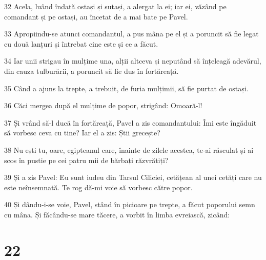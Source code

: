 \par 32 Acela, luând îndată ostași și sutași, a alergat la ei; iar ei, văzând pe comandant și pe ostași, au încetat de a mai bate pe Pavel.
\par 33 Apropiindu-se atunci comandantul, a pus mâna pe el și a poruncit să fie legat cu două lanțuri și întrebat cine este și ce a făcut.
\par 34 Iar unii strigau în mulțime una, alții altceva și neputând să înțeleagă adevărul, din cauza tulburării, a poruncit să fie dus în fortăreață.
\par 35 Când a ajuns la trepte, a trebuit, de furia mulțimii, să fie purtat de ostași.
\par 36 Căci mergea după el mulțime de popor, strigând: Omoară-l!
\par 37 Și vrând să-l ducă în fortăreață, Pavel a zis comandantului: Îmi este îngăduit să vorbesc ceva cu tine? Iar el a zis: Știi grecește?
\par 38 Nu ești tu, oare, egipteanul care, înainte de zilele acestea, te-ai răsculat și ai scos în pustie pe cei patru mii de bărbați răzvrătiți?
\par 39 Și a zis Pavel: Eu sunt iudeu din Tarsul Ciliciei, cetățean al unei cetăți care nu este neînsemnată. Te rog dă-mi voie să vorbesc către popor.
\par 40 Și dându-i-se voie, Pavel, stând în picioare pe trepte, a făcut poporului semn cu mâna. Și făcându-se mare tăcere, a vorbit în limba evreiască, zicând:

\chapter{22}


